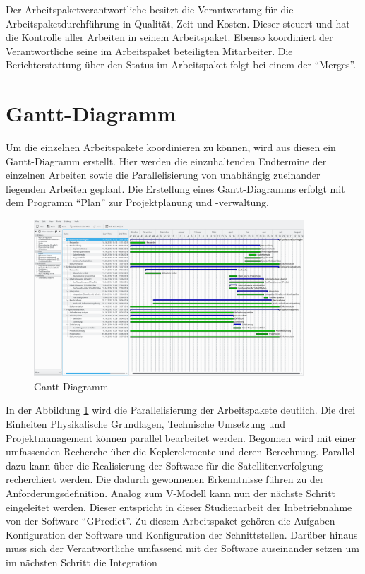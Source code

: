 Der Arbeitspaketverantwortliche besitzt die Verantwortung für die Arbeitspaketdurchführung in 
Qualität, Zeit und Kosten. Dieser steuert und hat die Kontrolle aller Arbeiten in seinem 
Arbeitspaket. Ebenso koordiniert der Verantwortliche seine im Arbeitspaket beteiligten Mitarbeiter. 
Die Berichterstattung über den Status im Arbeitspaket folgt bei einem der ``Merges''.

\section{Gantt-Diagramm}
Um die einzelnen Arbeitspakete koordinieren zu können, wird aus diesen ein Gantt-Diagramm 
erstellt. Hier werden die einzuhaltenden Endtermine der einzelnen Arbeiten sowie die 
Parallelisierung von unabhängig zueinander liegenden Arbeiten geplant. Die Erstellung eines Gantt-Diagramms erfolgt mit dem Programm ``Plan'' zur 
Projektplanung und -verwaltung. 
\begin{figure}[h] 
 \centering
\includegraphics[width=0.9\textwidth]{./images/gantt}
\caption{Gantt-Diagramm}
 \label{fig:gantt}
\end{figure}
In der Abbildung \ref{fig:gantt} wird die Parallelisierung der Arbeitspakete deutlich. Die drei Einheiten Physikalische Grundlagen, Technische 
Umsetzung 
und Projektmanagement können parallel bearbeitet werden. Begonnen wird mit einer umfassenden Recherche über die Keplerelemente und deren Berechnung. 
Parallel dazu kann über die  Realisierung der Software für die Satellitenverfolgung recherchiert werden. Die dadurch gewonnenen Erkenntnisse führen 
zu der Anforderungsdefinition. Analog zum V-Modell kann nun der nächste Schritt eingeleitet werden. Dieser entspricht in dieser Studienarbeit der 
Inbetriebnahme von der Software ``GPredict''. Zu diesem Arbeitspaket gehören die Aufgaben Konfiguration der Software und Konfiguration der 
Schnittstellen. Darüber hinaus muss sich der Verantwortliche umfassend mit der Software auseinander setzen um im nächsten Schritt die Integration 
